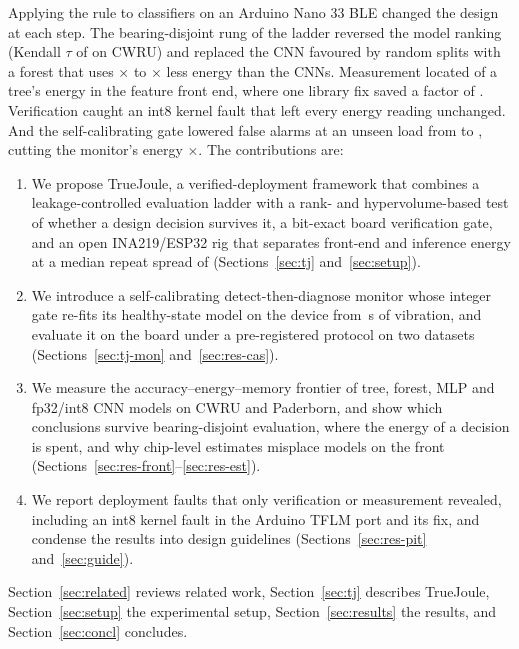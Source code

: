 \documentclass[conference]{IEEEtran}
\newcommand{\TJ}{TrueJoule}
\begin{document}
Applying the rule to \NumCwruNModels{} classifiers on an Arduino Nano 33 BLE changed the design at each step. The
bearing-disjoint rung of the ladder reversed the model ranking (Kendall $\tau$ of \NumCwruTauPOnePThree{} on CWRU) and
replaced the CNN favoured by random splits with a forest that uses \NumCwruCnnOverTreeMin$\times$ to
\NumCwruCnnOverTreeMax$\times$ less energy than the CNNs. Measurement located \NumCwruDTFrontShare{} of a tree's energy
in the feature front end, where one library fix saved a factor of \NumCwruLfFactorRThree{}. Verification caught an
int8 kernel fault that left every energy reading unchanged. And the self-calibrating gate lowered false alarms at an
unseen load from \NumCasCwGTwoFpr{} to \NumCasCwGFivenOneSixFpr{}, cutting the monitor's energy
\NumCasCwSaving$\times$. The contributions are:
\begin{enumerate}
\item We propose \TJ{}, a verified-deployment framework that combines a leakage-controlled evaluation ladder with a
rank- and hypervolume-based test of whether a design decision survives it, a bit-exact board verification gate, and
an open INA219/ESP32 rig that separates front-end and inference energy at a median repeat spread of
\NumCwruCvMed{} (Sections~\ref{sec:tj} and~\ref{sec:setup}).
\item We introduce a self-calibrating detect-then-diagnose monitor whose integer gate re-fits its healthy-state model
on the device from \NumCasCalibSixteenS\,s of vibration, and evaluate it on the board under a pre-registered protocol
on two datasets (Sections~\ref{sec:tj-mon} and~\ref{sec:res-cas}).
\item We measure the accuracy--energy--memory frontier of tree, forest, MLP and fp32/int8 CNN models on CWRU and
Paderborn, and show which conclusions survive bearing-disjoint evaluation, where the energy of a decision is spent,
and why chip-level estimates misplace models on the front (Sections~\ref{sec:res-front}--\ref{sec:res-est}).
\item We report deployment faults that only verification or measurement revealed, including an int8 kernel fault in
the Arduino TFLM port and its fix, and condense the results into design guidelines (Sections~\ref{sec:res-pit}
and~\ref{sec:guide}).
\end{enumerate}
Section~\ref{sec:related} reviews related work, Section~\ref{sec:tj} describes \TJ{}, Section~\ref{sec:setup} the
experimental setup, Section~\ref{sec:results} the results, and Section~\ref{sec:concl} concludes.
\end{document}
